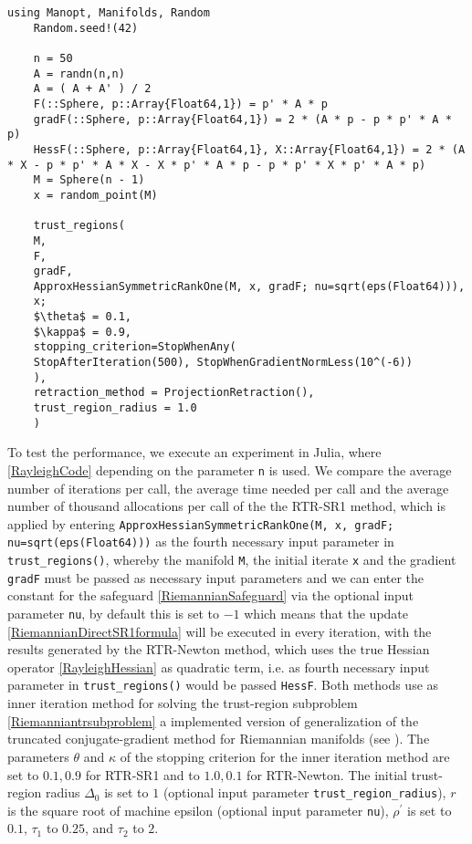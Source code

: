 \newpage

\begin{lstlisting}[mathescape, caption={The Rayleigh quotient minimization experiment in Julia for $n = 500$.}, label={RayleighCode}]
    using Manopt, Manifolds, Random
    Random.seed!(42)

    n = 50
    A = randn(n,n)
    A = ( A + A' ) / 2
    F(::Sphere, p::Array{Float64,1}) = p' * A * p
    gradF(::Sphere, p::Array{Float64,1}) = 2 * (A * p - p * p' * A * p)
    HessF(::Sphere, p::Array{Float64,1}, X::Array{Float64,1}) = 2 * (A * X - p * p' * A * X - X * p' * A * p - p * p' * X * p' * A * p)
    M = Sphere(n - 1)
    x = random_point(M)

    trust_regions(
    M,
    F,
    gradF,
    ApproxHessianSymmetricRankOne(M, x, gradF; nu=sqrt(eps(Float64))),
    x;
    $\theta$ = 0.1,
    $\kappa$ = 0.9,
    stopping_criterion=StopWhenAny(
    StopAfterIteration(500), StopWhenGradientNormLess(10^(-6))
    ),
    retraction_method = ProjectionRetraction(),
    trust_region_radius = 1.0
    )
\end{lstlisting}
To test the performance, we execute an experiment in Julia, where \cref{RayleighCode} depending on the parameter \lstinline!n! is used. We compare the average number of iterations per call, the average time needed per call and the average number of thousand allocations per call of the the RTR-SR1 method, which is applied by entering \lstinline!ApproxHessianSymmetricRankOne(M, x, gradF; nu=sqrt(eps(Float64)))! as the fourth necessary input parameter in \lstinline!trust_regions()!, whereby the manifold \lstinline!M!, the initial iterate \lstinline!x! and the gradient \lstinline!gradF! must be passed as necessary input parameters and we can enter the constant for the safeguard \cref{RiemannianSafeguard} via the optional input parameter \lstinline!nu!, by default this is set to $-1$ which means that the update \cref{RiemannianDirectSR1formula} will be executed in every iteration, with the results generated by the RTR-Newton method, which uses the true Hessian operator \cref{RayleighHessian} as quadratic term, i.e. as fourth necessary input parameter in \lstinline!trust_regions()! would be passed \lstinline!HessF!. Both methods use as inner iteration method for solving the trust-region subproblem \cref{Riemanniantrsubproblem} a implemented version of generalization of the truncated conjugate-gradient method for Riemannian manifolds (see \cite[Algorithm~11]{AbsilMahonySepulchre:2008}). The parameters $\theta$ and $\kappa$ of the stopping criterion \cite[(7.10)]{AbsilMahonySepulchre:2008} for the inner iteration method are set to $0.1, 0.9$ for RTR-SR1 and to $1.0, 0.1$ for RTR-Newton. The initial trust-region radius $\Delta_0$ is set to $1$ (optional input parameter \lstinline!trust_region_radius!), $r$ is the square root of machine epsilon (optional input parameter \lstinline!nu!), $\rho^{\prime}$ is set to $0.1$, $\tau_1$ to $0.25$, and $\tau_2$ to $2$. \\
